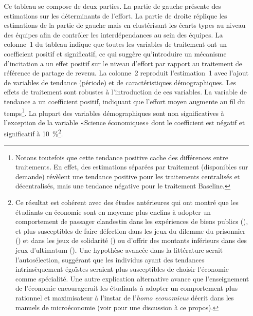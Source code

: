 \begin{Article}
\begin{refsection}[Lebourges]
Ce tableau se compose de deux parties. La partie de gauche présente
des estimations sur les déterminants de l'effort. La partie de droite
réplique les estimations de la partie de gauche mais en clustérisant les
écarts types au niveau des équipes afin de contrôler les
interdépendances au sein des équipes. La colonne~1 du tableau indique
que toutes les variables de traitement ont un coefficient positif et
significatif, ce qui suggère qu'introduire un mécanisme d'incitation a
un effet positif sur le niveau d'effort par rapport au traitement de
référence de partage de revenu. La colonne~2 reproduit l'estimation~1
avec l'ajout de variables de tendance (période) et de caractéristiques
démographiques. Les effets de traitement sont robustes à l'introduction
de ces variables. La variable de tendance a un coefficient positif,
indiquant que l'effort moyen augmente au fil du temps\footnote{Notons
  toutefois que cette tendance positive cache des différences entre
  traitements. En effet, des estimations séparées par traitement
  (disponibles sur demande) révèlent une tendance positive pour les
  traitements centralisés et décentralisés, mais une tendance négative
  pour le traitement Baseline.}. La plupart des variables démographiques
sont non significatives à l'exception de la variable «Science
économiques» dont le coefficient est négatif et significatif à
10~\%\footnote{Ce résultat est cohérent avec des études antérieures
  qui ont montré que les étudiants en économie sont en moyenne plus
  enclins à adopter un comportement de passager clandestin dans les
  expériences de biens publics (\textcite{MarwellAmes1981}), et plus
  susceptibles de faire défection dans les jeux du dilemme du prisonnier
  (\textcite{FrankGilovichRegan1993}) et dans les jeux de solidarité
  (\textcite{SeltenOckenfels1998}) ou d'offrir des montants inférieurs
  dans des jeux d'ultimatum (\textcite{CarterIrons1991}). Une hypothèse
  avancée dans la littérature serait l'autosélection, suggérant que les
  individus ayant des tendances intrinsèquement égoïstes seraient plus
  susceptibles de choisir l'économie comme spécialité. Une autre
  explication alternative avance que l'enseignement de l'économie
  encouragerait les étudiants à adopter un comportement plus rationnel
  et maximisateur à l'instar de l'\emph{homo economicus} décrit dans les
  manuels de microéconomie (voir \textcite{BaumanRose2009} pour une
  discussion à ce propos).}.


\end{refsection}
\end{Article}

